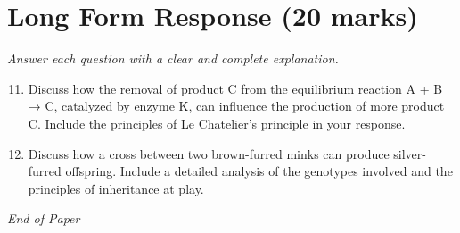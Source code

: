 \documentclass[12pt]{article}
\begin{document}
\section*{Long Form Response (20 marks)}
\textit{Answer each question with a clear and complete explanation.}
\begin{enumerate}[label=\arabic*.]
\setcounter{enumi}{10}
\item Discuss how the removal of product C from the equilibrium reaction A + B → C, catalyzed by enzyme K, can influence the production of more product C. Include the principles of Le Chatelier's principle in your response.
\item Discuss how a cross between two brown-furred minks can produce silver-furred offspring. Include a detailed analysis of the genotypes involved and the principles of inheritance at play.
\end{enumerate}

\vfill
\noindent\textit{End of Paper}
\end{document}
